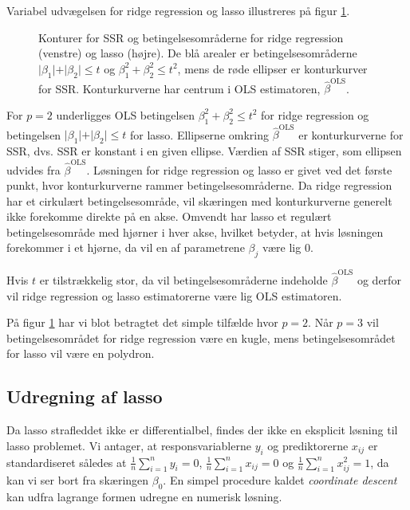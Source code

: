 Variabel udvægelsen for ridge regression og lasso illustreres på figur \ref{fig:LassoRig}.
\begin{figure}[H]
\centering
\begin{minipage}{0.4\linewidth}
\scalebox{0.7}{}
\end{minipage}
\hspace{0.2cm}
\begin{minipage}{0.4\linewidth}
\scalebox{0.7}{}
\end{minipage}
\caption{Konturer for SSR og betingelsesområderne for ridge regression (venstre) og lasso (højre). De blå arealer er betingelsesområderne $\vert \beta_1 \vert+\vert \beta_2 \vert \leq t$ og $\beta_1^2+\beta_2^2 \leq t^2$, mens de røde ellipser er konturkurver for SSR. Konturkurverne har centrum i OLS estimatoren, $\hat{\beta}^\text{OLS}$.} \label{fig:LassoRig}
\end{figure}
For $p=2$ underligges OLS betingelsen $\beta_1^2 + \beta_2^2 \leq t^2$ for ridge regression og betingelsen $\vert \beta_1 \vert + \vert \beta_2 \vert \leq t$ for lasso.
Ellipserne omkring $\hat{\beta}^{\text{OLS}}$ er konturkurverne for SSR, dvs. SSR er konstant i en given ellipse. Værdien af SSR stiger, som ellipsen udvides fra $\hat{\beta}^{\text{OLS}}$.
Løsningen for ridge regression og lasso er givet ved det første punkt, hvor konturkurverne rammer betingelsesområderne.
Da ridge regression har et cirkulært betingelsesområde, vil skæringen med konturkurverne generelt ikke forekomme direkte på en akse.
Omvendt har lasso et regulært betingelsesområde med hjørner i hver akse, hvilket betyder, at hvis løsningen forekommer i et hjørne, da vil en af parametrene $\beta_j$ være lig 0.

Hvis $t$ er tilstrækkelig stor, da vil betingelsesområderne indeholde $\hat{\beta}^{\text{OLS}}$ og derfor vil ridge regression og lasso estimatorerne være lig OLS estimatoren.

På figur \ref{fig:LassoRig} har vi blot betragtet det simple tilfælde hvor $p=2$. Når $p=3$ vil betingelsesområdet for ridge regression være en kugle, mens betingelsesområdet for lasso vil være en polydron. 

\subsection{Udregning af lasso}
Da lasso strafleddet ikke er differentialbel, findes der ikke en eksplicit løsning til lasso problemet.
Vi antager, at responsvariablerne $y_i$ og prediktorerne $x_{ij}$ er standardiseret således at \(\frac{1}{n} \sum_{i=1}^n y_{i} = 0\), \(\frac{1}{n} \sum_{i=1}^n x_{ij} = 0\) og \(\frac{1}{n} \sum_{i=1}^n x_{ij}^2=1\), da kan vi ser bort fra skæringen $\beta_0$.
En simpel procedure kaldet \textit{coordinate descent} kan udfra lagrange formen udregne en numerisk løsning. 
%
